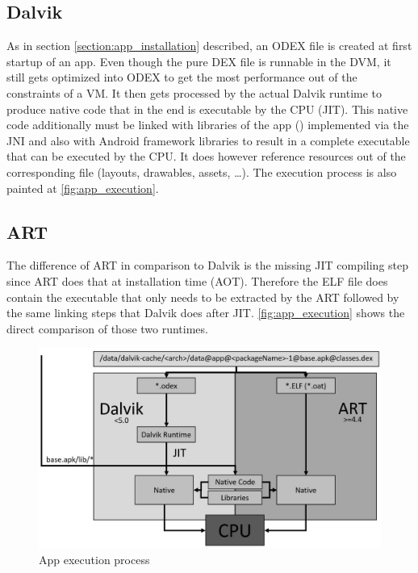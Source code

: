 \subsection{Dalvik}
As in section \autoref{section:app_installation} described, an
ODEX file is created at first startup of an app. Even though
the pure DEX file is runnable in the DVM, it still gets optimized
into ODEX to get the most performance out of the
constraints of a VM.
It then gets processed by the actual Dalvik runtime to produce
native code that in the end is executable by the CPU (JIT).
This native code additionally must be linked with libraries of the app
() implemented via the JNI
and also with Android framework libraries to result in a complete
executable that can be executed by the CPU. It does however
reference resources out of the corresponding  file (layouts,
drawables, assets, \ldots). The execution process is also painted
at \autoref{fig:app_execution}.

\subsection{ART}
The difference of ART in comparison to Dalvik is the missing
JIT compiling step since ART does that at installation time
(AOT). Therefore the ELF file does contain the executable that
only needs to be extracted by the ART followed by the same
linking steps that Dalvik does after JIT. \autoref{fig:app_execution}
shows the direct comparison of those two runtimes.

\begin{figure}[htb]
  \includegraphics[width=\textwidth]{figures/app_execution}
  \caption[App execution process]{App execution process}
  \label{fig:app_execution}
\end{figure}
